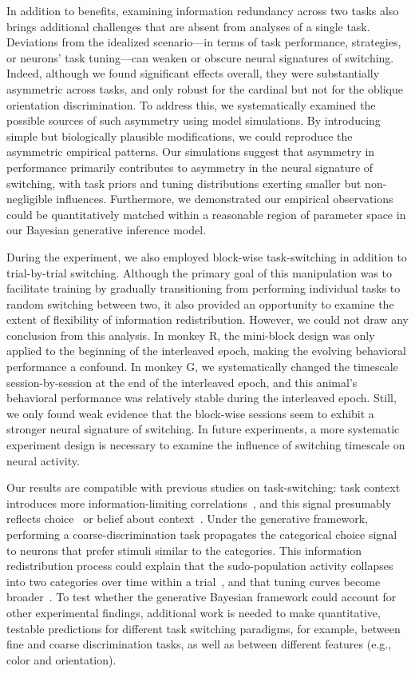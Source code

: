 \documentclass[lineno,pdflatex,sn-basic]{sn-jnl}%
\theoremstyle{thmstyleone}%
\theoremstyle{thmstyletwo}%
\theoremstyle{thmstylethree}%
\begin{document}
In addition to benefits, examining information redundancy across two tasks also brings additional challenges that are absent from analyses of a single task. Deviations from the idealized scenario—in terms of task performance, strategies, or neurons’ task tuning—can weaken or obscure neural signatures of switching. Indeed, although we found significant effects overall, they were substantially asymmetric across tasks, and only robust for the cardinal but not for the oblique orientation discrimination. To address this, we systematically examined the possible sources of such asymmetry using model simulations. By introducing simple but biologically plausible modifications, we could reproduce the asymmetric empirical patterns. Our simulations suggest that asymmetry in performance primarily contributes to asymmetry in the neural signature of switching, with task priors and tuning distributions exerting smaller but non-negligible influences. Furthermore, we demonstrated our empirical observations could be quantitatively matched within a reasonable region of parameter space in our Bayesian generative inference model.

During the experiment, we also employed block-wise task-switching in addition to trial-by-trial switching. Although the primary goal of this manipulation was to facilitate training by gradually transitioning from performing individual tasks to random switching between two, it also provided an opportunity to examine the extent of flexibility of information redistribution. However, we could not draw any conclusion from this analysis. In monkey R, the mini-block design was only applied to the beginning of the interleaved epoch, making the evolving behavioral performance a confound. In monkey G, we systematically changed the timescale session-by-session at the end of the interleaved epoch, and this animal's behavioral performance was relatively stable during the interleaved epoch. Still, we only found weak evidence that the block-wise sessions seem to exhibit a stronger neural signature of switching. In future experiments, a more systematic experiment design is necessary to examine the influence of switching timescale on neural activity.


Our results are compatible with previous studies on task-switching: task context introduces more information-limiting correlations~\citep{cohen2008context,bondy2018feedback}, and this signal presumably reflects choice~\citep{bondy2018feedback} or belief about context~\citep{xue2022dynamic}. Under the generative framework, performing a coarse-discrimination task propagates the categorical choice signal to neurons that prefer stimuli similar to the categories. This information redistribution process could explain that the sudo-population activity collapses into two categories over time within a trial~\citep{tajima2017task}, and that tuning curves become broader~\citep {park2023prior}. To test whether the generative Bayesian framework could account for other experimental findings, additional work is needed to make quantitative, testable predictions for different task switching paradigms, for example, between fine and coarse discrimination tasks, as well as between different features (e.g., color and orientation).
\end{document}
